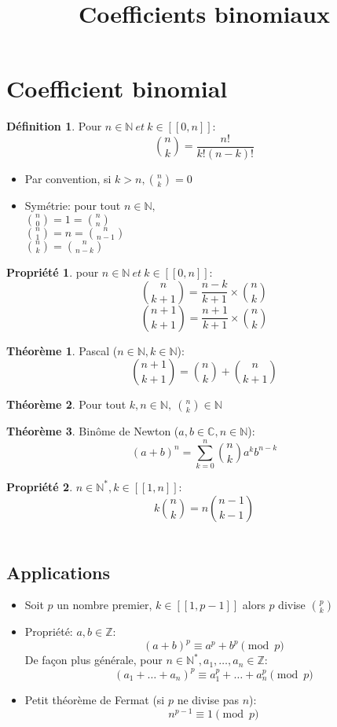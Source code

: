 \documentclass[fleqn]{article}
\title{Coefficients binomiaux}
\date{}
\theoremstyle{definition} \newtheorem*{defi}{D\'efinition}
\theoremstyle{definition} \newtheorem*{theo}{Th\'eor\`eme}
\theoremstyle{definition} \newtheorem*{prop}{Propri\'et\'e}
\begin{document}
\maketitle

\section{Coefficient binomial}
\begin{defi}
	Pour \(n \in \mathbb{N}\ et\ k \in [\![0,n]\!]\): \\
	\[ \binom{n}{k} = \frac{n!}{k!(n-k)!} \]
\end{defi}
\begin{itemize}
	\item Par convention, si $k>n, \binom{n}{k} = 0$
	\item Sym\'etrie: pour tout \(n \in \mathbb{N},\) \\
		$\binom{n}{0} = 1 = \binom{n}{n}$ \\
		$\binom{n}{1} = n = \binom{n}{n-1}$ \\
		$\binom{n}{k} = \binom{n}{n-k}$
\end{itemize}
\begin{prop} pour \(n \in \mathbb{N}\ et\ k \in [\![0,n]\!]\):
	\[\binom{n}{k+1} = \frac{n-k}{k+1} \times \binom{n}{k} \]
	\[\binom{n+1}{k+1} = \frac{n+1}{k+1} \times \binom{n}{k} \]
\end{prop}
\begin{theo} Pascal (\(n \in \mathbb{N}, k \in \mathbb{N}\)): \\
	\[\binom{n+1}{k+1} = \binom{n}{k} + \binom{n}{k+1}\]
\end{theo}
\begin{theo}
	Pour tout \(k,n \in \mathbb{N},\ \binom{n}{k} \in \mathbb{N}\)
\end{theo}
\begin{theo} Bin\^{o}me de Newton (\(a,b \in \mathbb{C}, n \in \mathbb{N}\)):
	\[(a+b)^n = \sum_{k=0}^{n} \binom{n}{k}a^kb^{n-k}\]
\end{theo}
\begin{prop} \(n \in \mathbb{N}^*, k \in [\![1,n]\!]\): \\
	\[k\binom{n}{k} = n\binom{n-1}{k-1}\] \\
\end{prop}

\subsection{Applications}
\begin{itemize}
	\item Soit \(p\) un nombre premier, \(k \in [\![1,p-1]\!]\) alors \(p\) divise \(\binom{p}{k}\)
	\item Propri\'{e}t\'{e}: \(a,b \in \mathbb{Z}\):
		\[(a+b)^p \equiv a^p + b^p \pmod{p}\]
		De fa\c{c}on plus g\'en\'erale, pour \(n \in \mathbb{N}^*, a_1, \hdots, a_n \in \mathbb{Z}\):
		\[(a_1+\hdots+a_n)^p \equiv a_1^p+\hdots+a_n^p \pmod{p}\]
	\item Petit th\'eor\`eme de Fermat (si \(p\) ne divise pas \(n\)):
		\[n^{p-1} \equiv 1\pmod{p} \]
\end{itemize}
\end{document}

